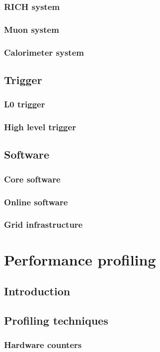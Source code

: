 \documentclass[12pt, a4paper]{article}
\begin{document}
\subsubsection{RICH system}
\subsubsection{Muon system}
\subsubsection{Calorimeter system}

\subsection{Trigger}
\subsubsection{L0 trigger}
\subsubsection{High level trigger}

\subsection{Software}
\subsubsection{Core software}
\subsubsection{Online software}
\subsubsection{Grid infrastructure}

\section{Performance profiling}
\subsection{Introduction}
\subsection{Profiling techniques}
\subsubsection{Hardware counters}
\end{document}

